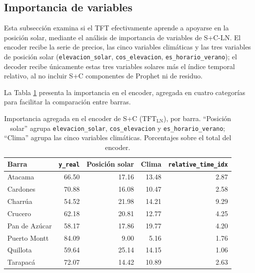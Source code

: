\subsection{Importancia de variables}
\label{sec:interpretabilidad_sc}

Esta subsección examina si el TFT efectivamente aprende a apoyarse en la posición solar, mediante el análisis de importancia de variables de S+C-LN. El encoder recibe la serie de precios, las cinco variables climáticas y las tres variables de posición solar (\texttt{elevacion\_solar}, \texttt{cos\_elevacion}, \texttt{es\_horario\_verano}); el decoder recibe únicamente estas tres variables solares más el índice temporal relativo, al no incluir S+C componentes de Prophet ni de residuo.

La Tabla \ref{tab:importancia_sc_encoder} presenta la importancia en el encoder, agregada en cuatro categorías para facilitar la comparación entre barras.

\begin{table}[htbp]
    \centering
    \small
    \begin{tabular}{lrrrr}
        \toprule
        Barra & \texttt{y\_real} & Posición solar & Clima & \texttt{relative\_time\_idx} \\
        \midrule
        Atacama       & 66.50 & 17.16 & 13.48 & 2.87 \\
        Cardones      & 70.88 & 16.08 & 10.47 & 2.58 \\
        Charrúa       & 54.52 & 21.98 & 14.21 & 9.29 \\
        Crucero       & 62.18 & 20.81 & 12.77 & 4.25 \\
        Pan de Azúcar & 58.17 & 17.86 & 19.77 & 4.20 \\
        Puerto Montt  & 84.09 &  9.00 &  5.16 & 1.76 \\
        Quillota      & 59.64 & 25.14 & 14.15 & 1.06 \\
        Tarapacá      & 72.07 & 14.42 & 10.89 & 2.63 \\
        \bottomrule
    \end{tabular}
    \vspace{0.2cm}
    \caption{Importancia agregada en el encoder de S+C ($\text{TFT}_\text{LN}$), por barra. ``Posición solar'' agrupa \texttt{elevacion\_solar}, \texttt{cos\_elevacion} y \texttt{es\_horario\_verano}; ``Clima'' agrupa las cinco variables climáticas. Porcentajes sobre el total del encoder.}
    \label{tab:importancia_sc_encoder}
\end{table}


